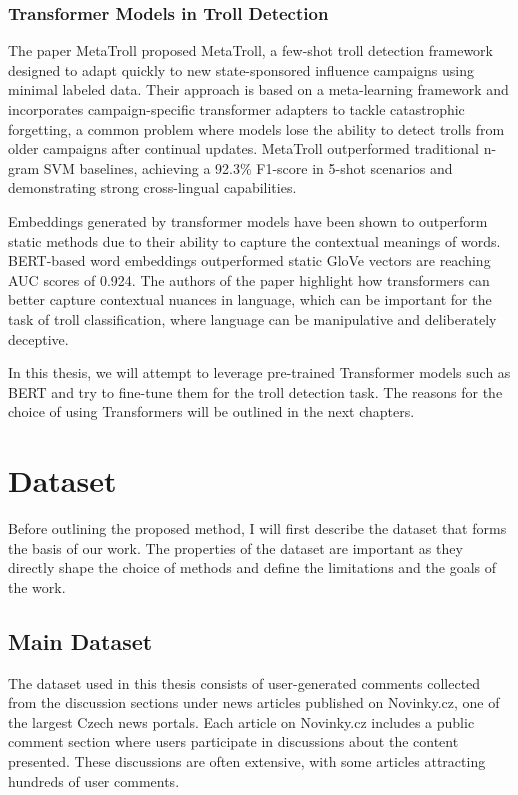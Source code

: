 \documentclass[twoside]{ctuthesis}
\theoremstyle{plain}
\theoremstyle{definition}
\theoremstyle{note}
\begin{document}
\subsection{Transformer Models in Troll Detection}
The paper MetaTroll proposed MetaTroll, a few-shot troll detection framework designed to adapt quickly to new state-sponsored influence campaigns using minimal labeled data. Their approach is based on a meta-learning framework and incorporates campaign-specific transformer adapters to tackle catastrophic forgetting, a common problem where models lose the ability to detect trolls from older campaigns after continual updates. MetaTroll outperformed traditional n-gram SVM baselines, achieving a 92.3\% F1-score in 5-shot scenarios and demonstrating strong cross-lingual capabilities\cite{Tian2023}.\par
Embeddings generated by transformer models have been shown to outperform static methods due to their ability to capture the contextual meanings of words. BERT-based word embeddings outperformed static GloVe vectors are reaching AUC scores of 0.924. The authors of the paper \cite{yilmaz2023} highlight how transformers can better capture contextual nuances in language, which can be important for the task of troll classification, where language can be manipulative and deliberately deceptive.

In this thesis, we will attempt to leverage pre-trained Transformer models such as BERT and try to fine-tune them for the troll detection task. The reasons for the choice of using Transformers will be outlined in the next chapters.\par

\chapter{Dataset}

Before outlining the proposed method, I will first describe the dataset that forms the basis of our work. The properties of the dataset are important as they directly shape the choice of methods and define the limitations and the goals of the work. \par

\section{Main Dataset}
The dataset used in this thesis consists of user-generated comments collected from the discussion sections under news articles published on Novinky.cz, one of the largest Czech news portals. Each article on Novinky.cz includes a public comment section where users participate in discussions about the content presented. These discussions are often extensive, with some articles attracting hundreds of user comments.\par
\end{document}
